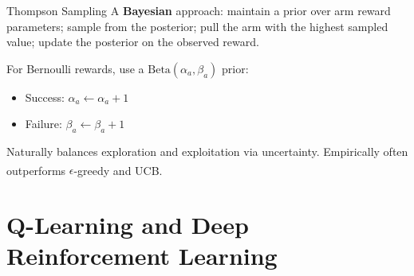 \begin{v3topic}{Thompson Sampling}
        A \textbf{Bayesian} approach: maintain a prior over arm reward
        parameters; sample from the posterior; pull the arm with the highest
        sampled value; update the posterior on the observed reward.

        For Bernoulli rewards, use a $\text{Beta}(\alpha_a, \beta_a)$ prior:
        \begin{itemize}
            \item Success: $\alpha_a \leftarrow \alpha_a + 1$
            \item Failure: $\beta_a \leftarrow \beta_a + 1$
        \end{itemize}
        Naturally balances exploration and exploitation via uncertainty.
        Empirically often outperforms $\epsilon$-greedy and
        UCB.\textsuperscript{\cite[][p.~338]{hurbansGrokkingArtificialIntelligence2020}}

\end{v3topic}


    \section{Q-Learning and Deep Reinforcement Learning}


